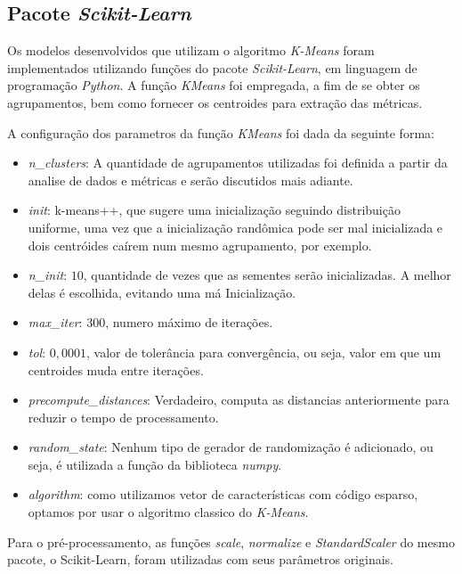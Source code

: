 \documentclass[conference]{IEEEtran}
\begin{document}
\subsection{Pacote \textit{Scikit-Learn}} \label{sec:pac}

Os modelos desenvolvidos que utilizam o algoritmo \emph{K-Means} foram implementados utilizando funções do pacote \emph{Scikit-Learn}, em linguagem de programação \emph{Python}. A função \emph{KMeans} foi empregada, a fim de se obter os agrupamentos, bem como fornecer os centroides para extração das métricas.

A configuração dos parametros da função \emph{KMeans} foi dada da seguinte forma:
\begin{itemize}
	\footnotesize \item \textit{n\_clusters}: A quantidade de agrupamentos utilizadas foi definida a partir da analise de dados e métricas e serão discutidos mais adiante.
	\footnotesize \item \textit{init}: k-means++, que sugere uma inicialização seguindo distribuição uniforme, uma vez que a inicialização randômica pode ser mal inicializada e dois centróides caírem num mesmo agrupamento, por exemplo.
	\footnotesize \item \textit{n\_init}: $10$, quantidade de vezes que as sementes serão inicializadas. A melhor delas é escolhida, evitando uma má Inicialização.
	\footnotesize \item \textit{max\_iter}: $300$, numero máximo de iterações.
	\footnotesize \item \textit{tol}: $0,0001$, valor de tolerância para convergência, ou seja, valor em que um centroides muda entre iterações.
	\footnotesize \item \textit{precompute\_distances}: Verdadeiro, computa as distancias anteriormente para reduzir o tempo de processamento.
	\footnotesize \item \textit{random\_state}: Nenhum tipo de gerador de randomização é adicionado, ou seja, é utilizada a função da biblioteca \emph{numpy}.
	\footnotesize \item \textit{algorithm}: como utilizamos vetor de características com código esparso, optamos por usar o algoritmo classico do \emph{K-Means}.
\end{itemize}

Para o pré-processamento, as funções \emph{scale}, \emph{normalize} e \emph{StandardScaler} do mesmo pacote, o Scikit-Learn, foram utilizadas com seus parâmetros originais.
\end{document}
